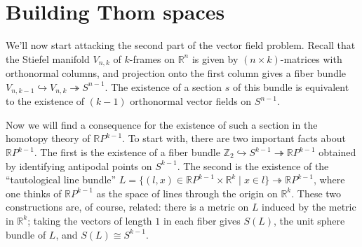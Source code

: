 \documentclass{article}
\providecommand{\OutputBuildingThomSpaces}{3}
\newcommand{\Z}{\mathbb{Z}}
\newcommand{\R}{\mathbb{R}}
\newcommand{\RP}{\R P}
\newcommand{\into}{\hookrightarrow}
\newcommand{\onto}{\twoheadrightarrow}
\begin{document}
\section{Building Thom spaces} %
\label{BuildingThomSpaces}
\ifx\OutputBuildingThomSpaces\undefined\else
We'll now start attacking the second part of the vector field problem.  Recall that the Stiefel manifold $V_{n, k}$ of $k$-frames on $\R^n$ is given by $(n \times k)$-matrices with orthonormal columns, and projection onto the first column gives a fiber bundle $V_{n, k-1} \into V_{n, k} \onto S^{n-1}$.  The existence of a section $s$ of this bundle is equivalent to the existence of $(k-1)$ orthonormal vector fields on $S^{n-1}$.

Now we will find a consequence for the existence of such a section in the homotopy theory of $\RP^{k-1}$.  To start with, there are two important facts about $\RP^{k-1}$.  The first is the existence of a fiber bundle $\Z_2 \into S^{k-1} \onto \RP^{k-1}$ obtained by identifying antipodal points on $S^{k-1}$.  The second is the existence of the ``tautological line bundle'' $L = \{(l, x) \in \RP^{k-1} \times \R^k \mid x \in l\} \onto \RP^{k-1}$, where one thinks of $\RP^{k-1}$ as the space of lines through the origin on $\R^k$.  These two constructions are, of course, related: there is a metric on $L$ induced by the metric in $\R^k$; taking the vectors of length $1$ in each fiber gives $S(L)$, the unit sphere bundle of $L$, and $S(L) \cong S^{k-1}$.
\end{document}

